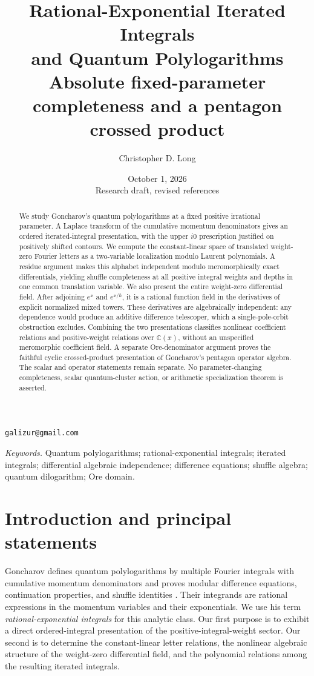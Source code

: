 \documentclass[11pt]{article}
\title{Rational-Exponential Iterated Integrals\\
and Quantum Polylogarithms\\[0.4em]
\large Absolute fixed-parameter completeness and a pentagon crossed product}
\author{Christopher D. Long}
\date{October 1, 2026\\\small Research draft, revised references}
\numberwithin{equation}{section}
\theoremstyle{definition}
\theoremstyle{remark}
\newcommand{\C}{\mathbb C}
\begin{document}
\maketitle
\begin{center}\small\texttt{galizur@gmail.com}\end{center}

\begin{abstract}
We study Goncharov's quantum polylogarithms at a fixed positive irrational
parameter. A Laplace transform of the cumulative momentum denominators gives
an ordered iterated-integral presentation, with the upper $i0$ prescription
justified on positively shifted contours. We compute the constant-linear
space of translated weight-zero Fourier letters as a two-variable localization
modulo Laurent polynomials. A residue argument makes this alphabet independent
modulo meromorphically exact differentials, yielding shuffle completeness at
all positive integral weights and depths in one common translation variable.
We also present the entire weight-zero differential field. After adjoining
$e^x$ and $e^{x/\hbar}$, it is a rational function field in the derivatives of
explicit normalized mixed towers. These derivatives are algebraically
independent: any dependence would produce an additive difference telescoper,
which a single-pole-orbit obstruction excludes. Combining the two presentations
classifies nonlinear coefficient relations and positive-weight relations over
$\C(x)$, without an unspecified meromorphic coefficient field. A separate
Ore-denominator argument proves the faithful cyclic crossed-product
presentation of Goncharov's pentagon operator algebra. The scalar and operator
statements remain separate. No parameter-changing completeness, scalar
quantum-cluster action, or arithmetic specialization theorem is asserted.
\end{abstract}

\medskip
\noindent\textit{Keywords.} Quantum polylogarithms; rational-exponential integrals;
iterated integrals; differential algebraic independence; difference equations;
shuffle algebra; quantum dilogarithm; Ore domain.

\clearpage
\tableofcontents
\clearpage

\section{Introduction and principal statements}\label{sec:intro}

Goncharov defines quantum polylogarithms by multiple Fourier integrals with
cumulative momentum denominators and proves modular difference equations,
continuation properties, and shuffle identities \cite{Goncharov2026}.
Their integrands are rational expressions in the momentum variables and their
exponentials. We use his term \emph{rational-exponential integrals} for this
analytic class. Our first purpose is to exhibit a direct ordered-integral
presentation of the positive-integral-weight sector. Our second is to determine
the constant-linear letter relations, the nonlinear algebraic structure of
the weight-zero differential field, and the polynomial relations among the
resulting iterated integrals.
\end{document}
